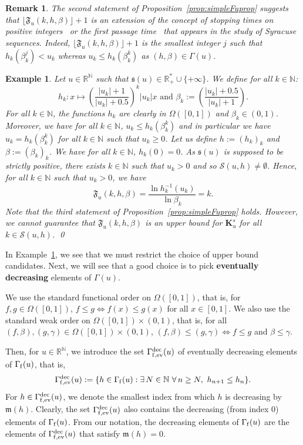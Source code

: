 \documentclass{article}
\def\valu#1{\mathfrak{s}(#1)}
\def\funset{\Gamma}
\def\fmonfung{{\funset}_{\rm f,{\rm ev}}^{\rm dec}}
\def\fset{\Omega([0,1])}
\def\mon{\mathfrak{m}}
\def\secfunh{\funset_{\rm f}}
\def\Fu{\mathfrak{F}_u}
\def\rr{\mathbb R}
\def\nn{\mathbb N}
\def\bigks{\mathbf{K}^s}
\def\res{\mathcal{S}}
\newtheorem{example}{Example}
\newtheorem{remark}{Remark}
\def\blue#1{#1}
\begin{document}
\blue{
\begin{remark}
		The second statement of Proposition~\ref{prop:simpleFuprop} suggests that $\lfloor\Fu(k,h,\beta)\rfloor+1$ is an extension of the concept of stopping times on positive integers~\cite{Terras1976} or the first passage time~\cite{tao2022almost} that appears in the study of Syracuse sequences. Indeed, $\lfloor\Fu(k,h,\beta)\rfloor+1$ is the smallest integer $j$ such that $h_k(\beta_k^j) < u_k$ whereas $u_k\leq h_k(\beta_k^k)$ as $(h,\beta)\in\funset(u)$.
		\end{remark}
}		
		
	\begin{example}
		\label{faussexam}
		Let $u\in\rr^\nn$ such that $\valu{u}\in\rr_+^\blue{*}\cup \{+\infty\}$. We define for all $k\in\nn$:
		\begin{equation}
			\label{examfond}
			h_k:x\mapsto \left(\frac{|u_k|+1}{|u_k|+0.5}\right)^k|u_k| x \text{ and } \beta_k:=\left(\frac{|u_k|+0.5}{|u_k|+1}\right).
		\end{equation}
		For all $k\in\nn$, the functions $h_k$ are clearly in $\fset$ and $\beta_k\in (0,1)$. Moreover, we have for all $k\in\nn$, $u_k\leq h_k(\beta_k^k)$ and in particular we have $u_k=h_k(\beta_k^k)$ for all $k\in\nn$ such that $u_k\geq 0$. Let us define $h:=(h_k)_k$ and $\beta:=(\beta_k)_k$. We have for all $k\in \nn$, $h_k(0)=0$. As $\valu{u}$ is supposed to be strictly positive, there exists $k\in\nn$ such that $u_k>0$ and so $\res(u,h)\neq \emptyset$. Hence, for all $k\in\nn$ such that $u_k>0$, we have
		\[
		\Fu(k,h,\beta)=\dfrac{\ln h_k^{-1} (u_k)}{\ln \beta_k}=k.  
		\]
		\blue{Note that the third statement of Proposition~\ref{prop:simpleFuprop} holds. However}, we cannot guarantee that $\Fu(k,h,\beta)$ is an upper bound for $\bigks_u$ for all $k\blue{\in\res(u,h)}$.
		\qed
	\end{example}
	In Example~\ref{faussexam}, we see that we must restrict the choice of upper bound candidates. Next, we will see that a good choice is to pick {\bf eventually decreasing} elements of $\funset(u)$.
	
	We use the standard functional order on $\fset$, that is, for $f,g\in\fset$, $f\leq g \iff f(x)\leq g(x)$ for all $x\in [0,1]$. We also use the standard weak order on $\fset\times (0,1)$, that is,  for all $(f,\beta), (g,\gamma)\in \fset\times (0,1)$, $(f,\beta)\leq (g,\gamma) \iff f\leq g $ and $\beta\leq \gamma$. 
	
Then, \blue{for $u\in\rr^\nn$, we introduce} the set $\fmonfung(u)$ of eventually decreasing elements of $\secfunh(u)$, that is,
	\[
	\fmonfung(u):=\{h\in\secfunh(u): \exists\, N\in \nn\ \forall\, n\geq N,\ h_{n+1}\leq h_n\}.
	\]
	For $h\in\fmonfung(u)$, we denote the smallest index from which $h$ is decreasing by $\mon(h)$. \blue{Clearly, the set $\fmonfung(u)$ also contains the decreasing (from index 0) elements of $\secfunh(u)$. From our notation, the decreasing elements of $\secfunh(u)$ are the elements of $\fmonfung(u)$ that satisfy $\mon(h)=0$.}
	
\end{document}
